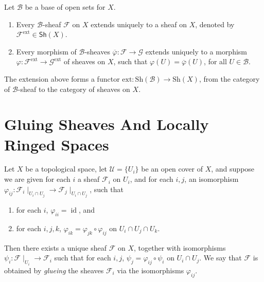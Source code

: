 \documentclass[11pt]{article}
\newcommand{\id}{\operatorname{id}}
\begin{document}
\begin{proposition}
  \cite[Proposition I-12]{EisenbudHarris} 
  Let $\mathcal{B}$ be a base of open sets for $X$. 
  \begin{enumerate}[label=(\arabic*)]
    \item Every $\mathcal{B}$-sheaf $ \mathscr{F} $ on $X$ extends uniquely to a sheaf on $X$, 
     denoted by $ \mathscr{F}^{\operatorname{ext}} \in \mathsf{Sh}(X)$. 

    \item Every morphism of $\mathcal{B}$-sheaves 
    $\overline{\varphi}:\mathscr{F} \to \mathscr{G}$ extends uniquely to a morphism 
    $\varphi:\mathscr{F}^{\operatorname{ext}} \to \mathscr{G}^{\operatorname{ext}}$ of sheaves on $ X $, 
    such that $\varphi(U)=\overline{\varphi}(U)$, for all $U \in \mathcal{B}$. 
  \end{enumerate}
  The extension above forms a functor $\mathrm{ext}:\mathrm{Sh}(\mathcal{B}) \to \mathrm{Sh}(X)$, 
  from the category of $\mathcal{B}$-sheaf to the category of sheaves on $X$. 
\end{proposition}

\section{Gluing Sheaves And Locally Ringed Spaces}

\begin{proposition}
  \cite[Exercise II.1.22]{hartsAG} 
  Let $ X $ be a topological space, let $ \mathcal{U} = \{U_{i}\} $ be 
  an open cover of $ X $, and suppose we are given for each $ i $ a sheaf $ \mathscr{F}_{i} $ 
  on $ U_{i} $, and for each $ i,j $, an isomorphism 
  $ \varphi_{ij}: \mathscr{F}_{i} \mid_{U_{i} \cap U_{j}} \to \mathscr{F}_{j}\mid_{U_{i} \cap U_{j}}$, 
  such that 
  \begin{enumerate}[label=(\arabic*)]
    \item for each $ i $, $ \varphi_{ii} = \id $, and
    \item for each $ i,j,k $, $ \varphi_{ik} = \varphi_{jk} \circ \varphi_{ij} $ on $U_{i} \cap U_{j} \cap U_{k} $.  
  \end{enumerate}
  Then there exists a unique sheaf $ \mathscr{F} $ on $ X $, together with 
  isomorphisms $ \psi_{i} :\mathscr{F}\mid_{U_{i}} \to \mathscr{F}_{i} $ such that for 
  each $ i,j $, $ \psi_{j} = \varphi_{ij} \circ \psi_{i} $ on $ U_{i} \cap U_{j}$. 
  We say that $ \mathscr{F} $ is obtained by \emph{glueing} the sheaves $ \mathscr{F}_{i} $ 
  via the isomorphisms $ \varphi_{ij} $. 
\end{proposition}
\end{document}
